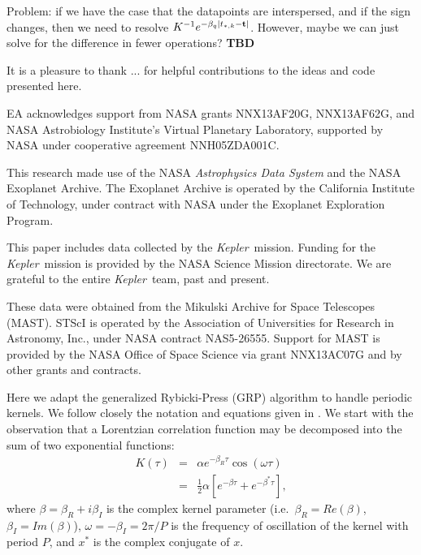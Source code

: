 \documentclass[manuscript, letterpaper]{aastex6}
\newcommand{\project}[1]{\textsl{#1}}
\newcommand{\kepler}{\project{Kepler}}
\begin{document}
Problem:  if we have the case that the datapoints are interspersed, and if the sign changes,
then we need to resolve $K^{-1} e^{-\beta_q \vert t_{*,k}-{\bf t}\vert}$.  However, maybe we can
just solve for the difference in fewer operations? {\bf TBD}

\acknowledgments
It is a pleasure to thank
...
for helpful contributions to the ideas and code presented here.

EA acknowledges support from NASA grants NNX13AF20G, NNX13AF62G, and
NASA Astrobiology Institute's Virtual Planetary Laboratory, supported
by NASA under cooperative agreement NNH05ZDA001C.

This research made use of the NASA \project{Astrophysics Data System} and the
NASA Exoplanet Archive.
The Exoplanet Archive is operated by the California Institute of Technology,
under contract with NASA under the Exoplanet Exploration Program.

This paper includes data collected by the \kepler\ mission. Funding for the
\kepler\ mission is provided by the NASA Science Mission directorate.
We are grateful to the entire \kepler\ team, past and present.

These data were obtained from the Mikulski Archive for Space Telescopes
(MAST).
STScI is operated by the Association of Universities for Research in
Astronomy, Inc., under NASA contract NAS5-26555.
Support for MAST is provided by the NASA Office of Space Science via grant
NNX13AC07G and by other grants and contracts.

\software{%
}

\appendix \label{appendixa}

Here we adapt the generalized Rybicki-Press (GRP) algorithm to handle periodic kernels.  We
follow closely the notation and equations given in \citet{Ambikasaran2015}.  We start
with the observation that a Lorentzian correlation function may be decomposed into the sum of two
exponential functions:
\begin{eqnarray}
K(\tau) &=& \alpha e^{-\beta_R \tau} \cos{(\omega \tau)}\\
 &=& \frac{1}{2}\alpha \left[e^{-\beta \tau}+e^{-\beta^* \tau}\right],
\end{eqnarray}
where $\beta = \beta_R + i\beta_I$ is the 
complex kernel parameter (i.e.\ $\beta_R = Re(\beta)$, $\beta_I = Im(\beta)$), $\omega = -\beta_I = 2\pi/P$
is the frequency of oscillation of the kernel with period $P$, and $x^*$ is the complex conjugate of $x$.
\end{document}
